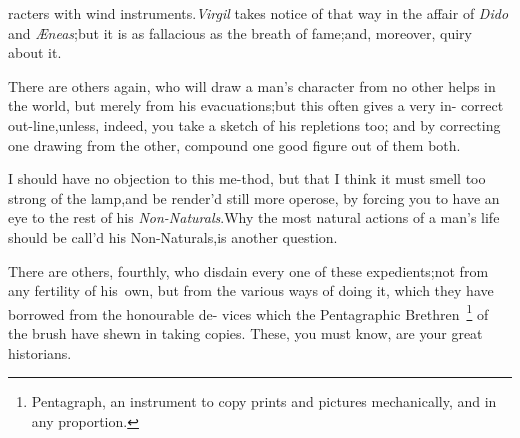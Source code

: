 \documentclass{article}
\begin{document}
\noindent
{}
racters with wind instruments.\tsk  \textit{Virgil} takes notice
of that way in the affair of \textit{Dido} and
\textit{Æneas};\tsk  but it is as fallacious as the breath of
fame;\tsk  and, moreover,
quiry about it.

There are others again, who will draw a man’s character
from no other helps in the world, but merely from his
evacuations;\tsk  but this often gives a very in-
correct out-line,\tsk  unless, indeed, you\break
take a sketch of his repletions too; and\break
by correcting one drawing from the\break
other, compound one good figure out of\break
them both.

I should have no objection to this me-\break thod, but that I think it
must smell too strong of the lamp,\tsk  and be render’d
still more operose, by forcing you to have an eye to the rest of
his \textit{Non-Naturals}.\tsk\break  Why the most natural actions of a
man’s life should be call’d his Non-Naturals,\tsk\break  is
another question.

There are others, fourthly, who disdain every one of these expedients;\tsk  not from
any fertility of his\sic\ own, but from the various ways of doing it, which they have
borrowed from the honourable de- vices which the Pentagraphic
Brethren~\footnote{\enspace Pentagraph, \vrule width 0pt height 16pt
an instrument to copy prints and pictures
mechanically, and in any proportion.} of the brush have shewn in
taking co\-pies.\tsk 
These, you must know, are your great historians.

\noindent
{}
\end{document}
